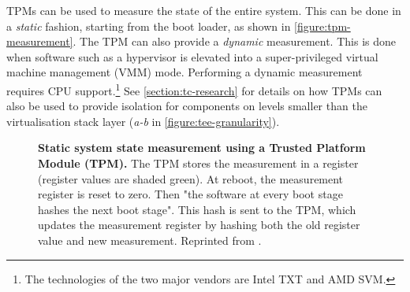 \begin{description}
TPMs can be used to measure the state of the entire system. This can be done in a \textit{static} fashion, starting from the boot loader, as shown in \autoref{figure:tpm-measurement}. The TPM can also provide a \textit{dynamic} measurement. This is done when software such as a hypervisor is elevated into a super-privileged virtual machine management (VMM) mode.\label{ID_1669235821}
Performing a dynamic measurement requires CPU support.\footnote{The technologies of the two major vendors are Intel TXT and AMD SVM.}\label{ID_447984718}
See \autoref{section:tc-research} for details on how TPMs can also be used to provide isolation for components on levels smaller than the virtualisation stack layer (\textit{a-b} in \autoref{figure:tee-granularity}).\label{ID_300626990}
\begin{figure}[htbp]
\makebox[\textwidth][c]{
}\caption{\textbf{Static system state measurement using a Trusted Platform Module (TPM).}\label{ID_734095868}
The TPM stores the measurement in a register (register values are shaded green).\label{ID_333225320}
At reboot, the measurement register is reset to zero. Then "the software at every boot stage hashes the next boot stage".\cite{sgx-explained}\label{ID_1944654012}
This hash is sent to the TPM, which updates the measurement register by hashing both the old register value and new measurement.\label{ID_1908069125}
Reprinted from \cite{sgx-explained}.\label{ID_1280723034}
\label{ID_1826130514}\label{figure:tpm-measurement}}
\end{figure}


\end{description}
